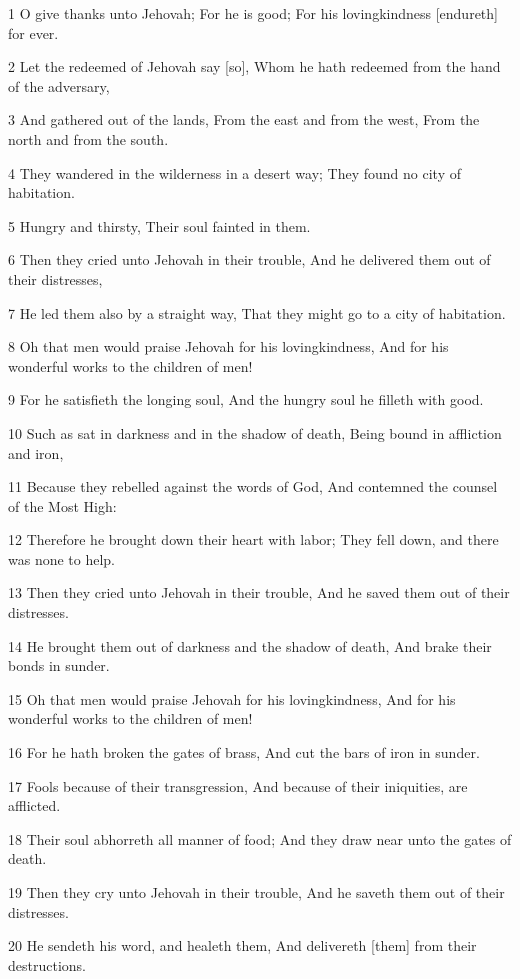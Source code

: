 \par 1 O give thanks unto Jehovah; For he is good; For his lovingkindness [endureth] for ever.
\par 2 Let the redeemed of Jehovah say [so], Whom he hath redeemed from the hand of the adversary,
\par 3 And gathered out of the lands, From the east and from the west, From the north and from the south.
\par 4 They wandered in the wilderness in a desert way; They found no city of habitation.
\par 5 Hungry and thirsty, Their soul fainted in them.
\par 6 Then they cried unto Jehovah in their trouble, And he delivered them out of their distresses,
\par 7 He led them also by a straight way, That they might go to a city of habitation.
\par 8 Oh that men would praise Jehovah for his lovingkindness, And for his wonderful works to the children of men!
\par 9 For he satisfieth the longing soul, And the hungry soul he filleth with good.
\par 10 Such as sat in darkness and in the shadow of death, Being bound in affliction and iron,
\par 11 Because they rebelled against the words of God, And contemned the counsel of the Most High:
\par 12 Therefore he brought down their heart with labor; They fell down, and there was none to help.
\par 13 Then they cried unto Jehovah in their trouble, And he saved them out of their distresses.
\par 14 He brought them out of darkness and the shadow of death, And brake their bonds in sunder.
\par 15 Oh that men would praise Jehovah for his lovingkindness, And for his wonderful works to the children of men!
\par 16 For he hath broken the gates of brass, And cut the bars of iron in sunder.
\par 17 Fools because of their transgression, And because of their iniquities, are afflicted.
\par 18 Their soul abhorreth all manner of food; And they draw near unto the gates of death.
\par 19 Then they cry unto Jehovah in their trouble, And he saveth them out of their distresses.
\par 20 He sendeth his word, and healeth them, And delivereth [them] from their destructions.
